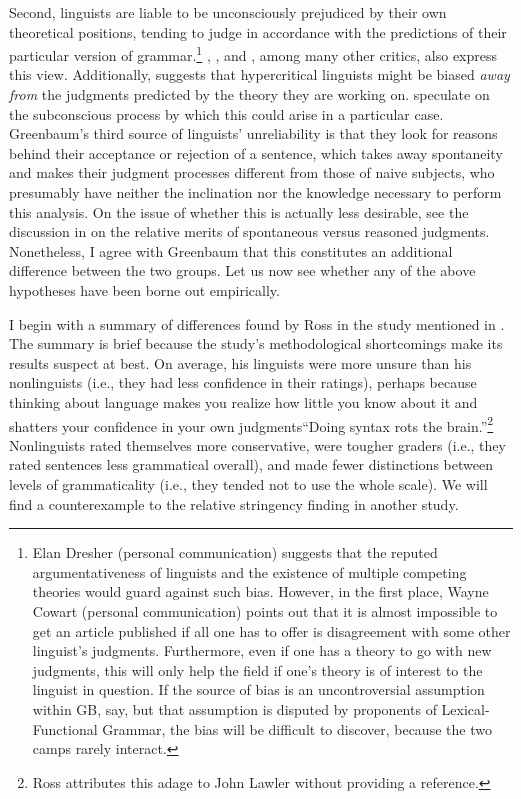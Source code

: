 Second, linguists are liable to be unconsciously prejudiced by their own theoretical positions, tending to judge in accordance with the predictions of their particular version of grammar.\footnote{Elan Dresher (personal communication) suggests that the reputed argumentativeness of linguists and the existence of multiple competing theories would guard against such bias. However, in the first place, Wayne Cowart (personal communication) points out that it is almost impossible to get 
an article published if all one has to offer is disagreement with some other linguist's judgments. Furthermore, even if one has a theory to go with new judgments, this will only help the field if one's theory is of interest to the linguist in question. If the source of bias is an uncontroversial assumption within GB, say, but that assumption is disputed by proponents of Lexical-Functional Grammar, the bias will be difficult to discover, because the two camps rarely interact.}
 \citet{Botha1973}, \citet{Derwing1973}, \citet{Sampson1975}
 and \citet{Ringen1979}, among many other
critics, also express this view. Additionally, \citet{Levelt1974} suggests that hypercritical linguists might be biased \textit{away from} the judgments predicted by the theory they are working on. \citet{CardenEtAl1981} speculate on the subconscious process by which this could arise in a particular case. Greenbaum's third source of linguists' unreliability is that they look for reasons behind their acceptance or rejection of a sentence, which takes away spontaneity and makes their judgment processes different from those of naive subjects, who presumably have neither the inclination nor the knowledge necessary to perform this analysis. On the issue of whether this is actually less desirable, see the discussion in  on the
relative merits of spontaneous versus reasoned judgments. Nonetheless, I agree with Greenbaum that this constitutes an additional difference between the two groups. Let us now see whether any of the above hypotheses have been borne out empirically.

I begin with a summary of differences found by Ross in the study mentioned in . The summary is brief because the study's methodological shortcomings make its results suspect at best. On average, his linguists were more unsure than his nonlinguists (i.e., they had less confidence in their ratings), perhaps because thinking about language makes you realize how little you know about it and shatters your confidence in your own judgments\schdash{}``Doing syntax rots the brain.''\footnote{Ross attributes this adage to John Lawler without providing a reference.}
 Nonlinguists rated themselves more conservative, were tougher graders (i.e., they rated sentences less grammatical overall), and made fewer distinctions between levels of grammaticality (i.e., they tended not to use the whole scale). We will find a counterexample to the relative stringency finding in another study.

